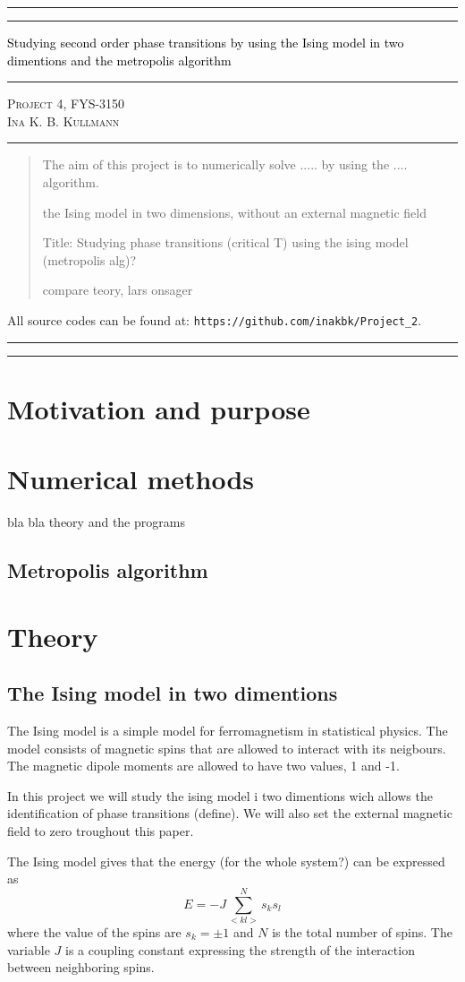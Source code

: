 \documentclass[11pt,a4wide]{article}
\newcommand*{\titleAT}{\begingroup %
\newlength{\drop} %
\drop=0.1\textheight %

\rule{\textwidth}{1pt}\par %
\vspace{2pt}\vspace{-\baselineskip} %
\rule{\textwidth}{0.4pt}\par %

\vspace{0.5\drop} %
\centering %
\textcolor{black}{ %
{\Huge Studying second order phase transitions by using the Ising model in two dimentions and the metropolis algorithm}\\[0.75\baselineskip] %
} 

\vspace{0.25\drop} %
\rule{0.3\textwidth}{0.4pt}\par %
\vspace{0.25\drop} %

{\Large \textsc{Project 4, FYS-3150\\[0.75\baselineskip] \normalsize{Ina K. B. Kullmann}
}}\par %


\vspace{0.25\drop} %
\rule{0.3\textwidth}{0.4pt}\par %
\vspace{0.25\drop} %

\begin{abstract}
The aim of this project is to numerically solve ..... by using the .... algorithm. 


the Ising model in two dimensions, without an external magnetic 
field

Title: Studying phase transitions (critical T) using the ising model (metropolis alg)?

compare teory, lars onsager





\end{abstract}
\vspace*{0.25\drop} %

\begin{center}
{ \scriptsize \noindent All source codes can be found at: \texttt{https://github.com/inakbk/Project\_2}. }
\end{center}

\rule{\textwidth}{0.4pt}\par %
\vspace{2pt}\vspace{-\baselineskip} %
\rule{\textwidth}{1pt}\par %

\endgroup}
\begin{document}
\titleAT %


\newpage
\tableofcontents
\newpage

\section{Motivation and purpose}


\section{Numerical methods}
bla bla theory and the programs
\subsection{Metropolis algorithm}

\section{Theory}
\subsection{The Ising model in two dimentions}

The Ising model is a simple model for ferromagnetism in statistical physics. The model consists of magnetic spins that are allowed to interact with its neigbours. The magnetic dipole moments are allowed to have two values, 1 and -1.

In this project we will study the ising model i two dimentions wich allows the identification of phase transitions (define). We will also set the external magnetic field to zero troughout this paper.



The Ising model gives that the energy (for the whole system?) can be expressed as
\begin{equation}
  E=-J\sum_{<kl>}^{N}s_ks_l
\end{equation}
where the value of the spins are  $s_k=\pm 1$ and $N$ is the total number of spins. The variable $J$ is a coupling constant expressing the strength of the interaction between neighboring spins.
\end{document}
